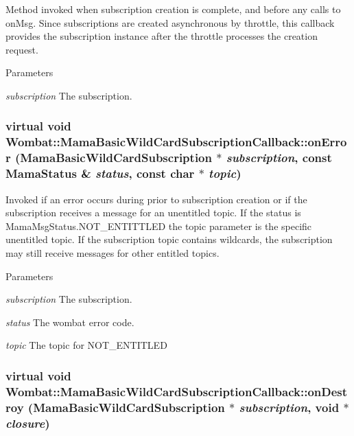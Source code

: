 Method invoked when subscription creation is complete, and before any calls to {\ttfamily onMsg}. Since subscriptions are created asynchronous by throttle, this callback provides the subscription instance after the throttle processes the creation request.


\begin{DoxyParams}{Parameters}
\item[{\em subscription}]The subscription. \end{DoxyParams}
\hypertarget{classWombat_1_1MamaBasicWildCardSubscriptionCallback_a89212077d27b4799729d606471df27fa}{
\subsubsection[{onError}]{\setlength{\rightskip}{0pt plus 5cm}virtual void Wombat::MamaBasicWildCardSubscriptionCallback::onError ({\bf MamaBasicWildCardSubscription} $\ast$ {\em subscription}, \/  const {\bf MamaStatus} \& {\em status}, \/  const char $\ast$ {\em topic})}}
\label{classWombat_1_1MamaBasicWildCardSubscriptionCallback_a89212077d27b4799729d606471df27fa}


Invoked if an error occurs during prior to subscription creation or if the subscription receives a message for an unentitled topic. If the status is {\ttfamily MamaMsgStatus.NOT\_\-ENTITTLED} the topic parameter is the specific unentitled topic. If the subscription topic contains wildcards, the subscription may still receive messages for other entitled topics.


\begin{DoxyParams}{Parameters}
\item[{\em subscription}]The subscription. \item[{\em status}]The wombat error code. \item[{\em topic}]The topic for NOT\_\-ENTITLED \end{DoxyParams}
\hypertarget{classWombat_1_1MamaBasicWildCardSubscriptionCallback_ac92c3c2a87d78f82257b57b902b1eb41}{
\subsubsection[{onDestroy}]{\setlength{\rightskip}{0pt plus 5cm}virtual void Wombat::MamaBasicWildCardSubscriptionCallback::onDestroy ({\bf MamaBasicWildCardSubscription} $\ast$ {\em subscription}, \/  void $\ast$ {\em closure})}}
\label{classWombat_1_1MamaBasicWildCardSubscriptionCallback_ac92c3c2a87d78f82257b57b902b1eb41}


